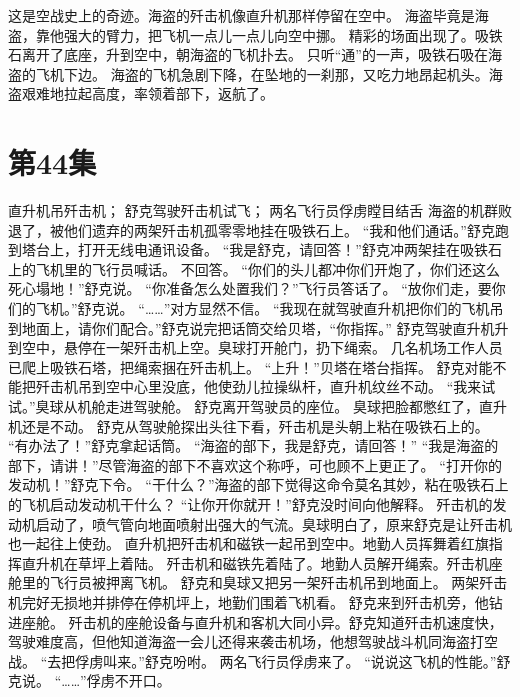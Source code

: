 \documentclass[a4paper,12pt,UTF8,twoside]{ctexbook}
\begin{document}
        这是空战史上的奇迹。海盗的歼击机像直升机那样停留在空中。 
        海盗毕竟是海盗，靠他强大的臂力，把飞机一点儿一点儿向空中挪。 
        精彩的场面出现了。吸铁石离开了底座，升到空中，朝海盗的飞机扑去。 
        只听“通”的一声，吸铁石吸在海盗的飞机下边。 
        海盗的飞机急剧下降，在坠地的一刹那，又吃力地昂起机头。海盗艰难地拉起高度，率领着部下，返航了。   \chapter{第44集} 
        直升机吊歼击机； 
        舒克驾驶歼击机试飞； 
        两名飞行员俘虏瞠目结舌   
        海盗的机群败退了，被他们遗弃的两架歼击机孤零零地挂在吸铁石上。 
        “我和他们通话。”舒克跑到塔台上，打开无线电通讯设备。 
        “我是舒克，请回答！”舒克冲两架挂在吸铁石上的飞机里的飞行员喊话。 
        不回答。 
        “你们的头儿都冲你们开炮了，你们还这么死心塌地！”舒克说。 
        “你准备怎么处置我们？”飞行员答话了。 
        “放你们走，要你们的飞机。”舒克说。 
        “……”对方显然不信。 
        “我现在就驾驶直升机把你们的飞机吊到地面上，请你们配合。”舒克说完把话筒交给贝塔，“你指挥。” 
        舒克驾驶直升机升到空中，悬停在一架歼击机上空。臭球打开舱门，扔下绳索。 
        几名机场工作人员已爬上吸铁石塔，把绳索捆在歼击机上。 
        “上升！”贝塔在塔台指挥。 
        舒克对能不能把歼击机吊到空中心里没底，他使劲儿拉操纵杆，直升机纹丝不动。 
        “我来试试。”臭球从机舱走进驾驶舱。 
        舒克离开驾驶员的座位。 
        臭球把脸都憋红了，直升机还是不动。 
        舒克从驾驶舱探出头往下看，歼击机是头朝上粘在吸铁石上的。 
        “有办法了！”舒克拿起话筒。 
        “海盗的部下，我是舒克，请回答！” 
        “我是海盗的部下，请讲！”尽管海盗的部下不喜欢这个称呼，可也顾不上更正了。 
        “打开你的发动机！”舒克下令。 
        “干什么？”海盗的部下觉得这命令莫名其妙，粘在吸铁石上的飞机启动发动机干什么？ 
        “让你开你就开！”舒克没时间向他解释。 
        歼击机的发动机启动了，喷气管向地面喷射出强大的气流。臭球明白了，原来舒克是让歼击机也一起往上使劲。 
        直升机把歼击机和磁铁一起吊到空中。地勤人员挥舞着红旗指挥直升机在草坪上着陆。 
        歼击机和磁铁先着陆了。地勤人员解开绳索。歼击机座舱里的飞行员被押离飞机。 
        舒克和臭球又把另一架歼击机吊到地面上。 
        两架歼击机完好无损地并排停在停机坪上，地勤们围着飞机看。 
        舒克来到歼击机旁，他钻进座舱。 
        歼击机的座舱设备与直升机和客机大同小异。舒克知道歼击机速度快，驾驶难度高，但他知道海盗一会儿还得来袭击机场，他想驾驶战斗机同海盗打空战。 
        “去把俘虏叫来。”舒克吩咐。 
        两名飞行员俘虏来了。 
        “说说这飞机的性能。”舒克说。 
        “……”俘虏不开口。 
\end{document}
